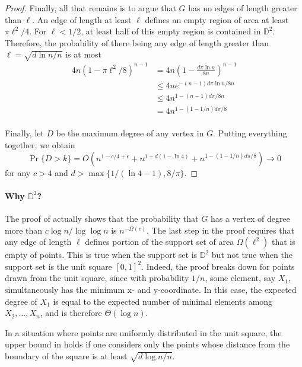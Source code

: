 \documentclass[lotsofwhite,charterfonts]{patmorin}
\newcommand{\D}{\mathbb{D}}
\begin{document}
\begin{proof}
Finally, all that remains is to argue that $G$ has no edges of length
greater than $\ell$.  An edge of length at least $\ell$ defines an empty
region of area at least $\pi\ell^2/4$.  For $\ell < 1/2$, at least half of this
empty region is contained in $\D^2$.  Therefore, the probability of there
being any edge of length greater than $\ell=\sqrt{d\ln n/n}$ is at most
\[
 \begin{aligned}
   4n(1-\pi\ell^2/8)^{n-1} 
    &  =  4n\left(1-\frac{d\pi\ln n}{8n}\right)^{n-1} \\
    & \le 4ne^{-(n-1)d\pi\ln n/8n} \\
    & \le 4n^{1-(n-1)d\pi/8n} \\
    & = 4n^{1-(1-1/n)d\pi/8} \\
 \end{aligned}
\]

Finally, let $D$ be the maximum degree of any vertex in $G$.  Putting
everything together, we obtain
\[
   \Pr\{D > k\} = O(n^{1-c/4+\epsilon} 
                      + n^{1+d(1-\ln 4)}
                      + n^{1-(1-1/n)d\pi/8} )  \rightarrow 0
\]
for any
$c > 4$ and $d>\max\{1/(\ln 4-1),8/\pi\}$.
\end{proof}

\paragraph{Why $\D^2$?} 
The proof of  actually shows that the
probability that $G$ has a vertex of degree more than $c\log n/\log\log n$
is $n^{-\Omega(c)}$.  The last step in the proof requires that any edge of
length $\ell$ defines portion of the support set of area $\Omega(\ell^2)$
that is empty of points.  This is true when the support set is $\D^2$
but not true when the support set is the unit square $[0,1]^2$.
Indeed, the proof breaks down for points drawn from the unit square,
since with probability $1/n$, some element, say $X_1$, simultaneously
has the minimum $\mathrm x$- and $\mathrm y$-coordinate.  In this case,
the expected degree of $X_1$ is equal to the expected number of minimal
elements among $X_2,\ldots,X_n$, and is therefore $\Theta(\log n)$.

In a situation where points are uniformly distributed in the unit square,
the upper bound in  holds if one considers only
the points whose distance from the boundary of the square is at least
$\sqrt{d\log n/n}$.
\end{document}
